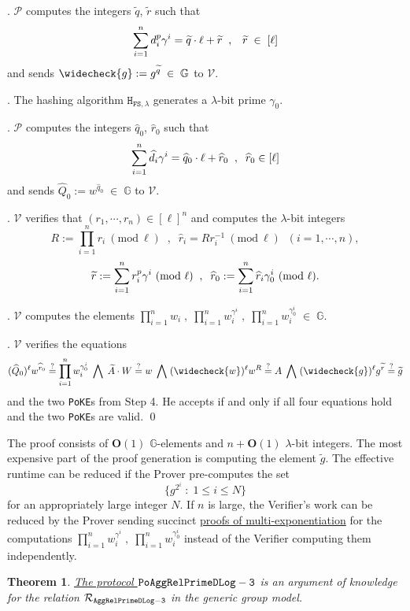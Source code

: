 \documentclass[11pt, lettersize, notitlepage, leqno, footskip=0.6cm]{article}
\newcommand{\pl}{\prod\limits}
\newcommand{\slim}{\sum\limits}
\newcommand{\ttt}{\texttt}
\newcommand{\bG}{\mathbb{G}}
\newcommand{\wti}{\widetilde}
\newcommand{\mc}{\mathcal}
\newcommand{\mb}{\mathbb}
\newcommand{\mbf}{\mathbf}
\newcommand{\lam}{\lambda}
\newcommand{\what}{\widehat}
\newcommand{\weck}{\widecheck}
\newcommand{\bO}{\mbf{O}}
\newcommand{\mP}{\mc{P}}
\newcommand{\V}{\mc{V}}
\newcommand{\vs}{\vspace{-0.15cm}}
\newcommand{\noin}{\noindent}
\newcommand{\sta}{\stackrel{?}{=}}
\newcommand{\Mod}[1]{\ (\mathrm{mod}\ #1)}
\newtheorem{Thm}{Theorem}[section]
\numberwithin{equation}{section}
\begin{document}
\begin{enumerate}[wide, labelwidth=!, labelindent=0pt]
\noin 10. $\mP$ computes the integers $\wti{q}$, $\wti{r}$ such that \vs $$\slim_{i=1}^n {d}_i^{p}\gamma^i = \wti{q}\cdot\ell+\wti{r}\;\;,\;\;\;\wti{r}\;\in\; [\ell]\vs $$ and sends $ \weck{g}:= g^{\wti{q}}\;\in\;\bG$ to $\V$.

\noin 11. The hashing algorithm $\ttt{H}_{\ttt{FS},\lam}$ generates a $\lam$-bit prime $\gamma_{0}$.

\noin 12. $\mP$ computes the integers $\what{q}_0$, $ \what{r}_0$ such that \vs $$\slim_{i=1}^n \what{d}_i\gamma^i = \what{q}_0\cdot \ell+\what{r}_0\;\;,\;\;\what{r}_0\in [\ell]\vs $$ and sends $\what{Q}_0:= w^{\what{q}_0} \;\in\;\bG$ to $\V$.

\noin 13. $\V$ verifies that $(r_1,\cdots,r_n)\in [\ell]^{n}$ and computes the $\lam$-bit integers \vs $$R:= \pl_{i=1}^n r_i\Mod{\ell} \;\;,\;\;\what{r}_i = Rr_i^{-1}\Mod{\ell}\;\;(i=1,\cdots,n),$$\vspace{-0.3cm} $$\wti{r}:= \slim_{i=1}^n {r}_i^{p}\gamma^i\Mod{\ell} \;\;,\;\;\what{r}_0:= \slim_{i=1}^n \what{r}_i\gamma_{0}^i\Mod{\ell}. \vs $$

\noin 14. $\V$ computes the elements $\prod_{i=1}^n w_i\;,\;\prod_{i=1}^n w_i^{\gamma^i}\;,\;\prod_{i=1}^n w_i^{\gamma_0^i}\;\in\;\bG$.

\noin 15. $\V$ verifies the equations \vs $$(\what{Q}_0)^{\ell}w^{\what{r}_0}\sta \pl_{i=1}^n w_i^{\gamma_{0}^i}\;\bigwedge\; \wti{A}\cdot W\sta w\;\bigwedge\; (\weck{w})^{\ell}w^R\sta A\;\bigwedge\; (\weck{g})^{\ell}g^{\wti{r}}\sta\wti{g} \vs $$ and the two \verb|PoKE|s from Step 4. He accepts if and only if all four equations hold and the two \verb|PoKE|s are valid. \qed \end{enumerate}

\noin The proof consists of $\bO(1)$ $\mb{G}$-elements and $n+\bO(1)$ $\lam$-bit integers. The most expensive part of the proof generation is computing the element $\wti{g}$. The effective runtime can be reduced if the Prover pre-computes the set $$\{g^{2^i}\;:\;1\leq i\leq N  \}$$ for an appropriately large integer $N$. If $n$ is large, the Verifier's work can be reduced by the Prover sending succinct \hyperlink{PoME}{proofs of multi-exponentiation} for the computations $\prod_{i=1}^n w_i^{\gamma^i}\;,\;\prod_{i=1}^n w_i^{\gamma_0^i}$ instead of the Verifier computing them independently.

\vspace{0.15cm}

\begin{Thm} \hyperlink{RP3}{The protocol ${\tt{PoAggRelPrimeDLog}-3}$} is an argument of knowledge for the relation $\mc{R}_{\tt{AggRelPrimeDLog-3}}$ in the generic group model.\end{Thm}
\end{document}
